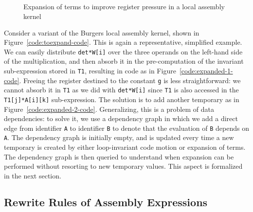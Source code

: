 
\begin{figure}
\footnotesize
{}
~\\
~\\
~\\
~\\
\caption{Expansion of terms to improve register pressure in a local assembly kernel}\label{code:expanded-code}
\end{figure}

Consider a variant of the Burgers local assembly kernel, shown in Figure~\ref{code:toexpand-code}. This is again a representative, simplified example. We can easily distribute \texttt{det*W[i]} over the three operands on the left-hand side of the multiplication, and then absorb it in the pre-computation of the invariant sub-expression stored in \texttt{T1}, resulting in code as in Figure~\ref{code:expanded-1-code}. Freeing the register destined to the constant \texttt{g} is less straightforward: we cannot absorb it in \texttt{T1} as we did with \texttt{det*W[i]} since \texttt{T1} is also accessed in the \texttt{T1[j]*A[i][k]} sub-expression. The solution is to add another temporary as in Figure~\ref{code:expanded-2-code}. Generalizing, this is a problem of data dependencies: to solve it, we use a dependency graph in which we add a direct edge from identifier \texttt{A} to identifier \texttt{B} to denote that the evaluation of \texttt{B} depends on \texttt{A}. The dependency graph is initially empty, and is updated every time a new temporary is created by either loop-invariant code motion or expansion of terms. The dependency graph is then queried to understand when expansion can be performed without resorting to new temporary values. This aspect is formalized in the next section.

\subsection{Rewrite Rules of Assembly Expressions}
\label{sec:coffee-rewrite-rules}

